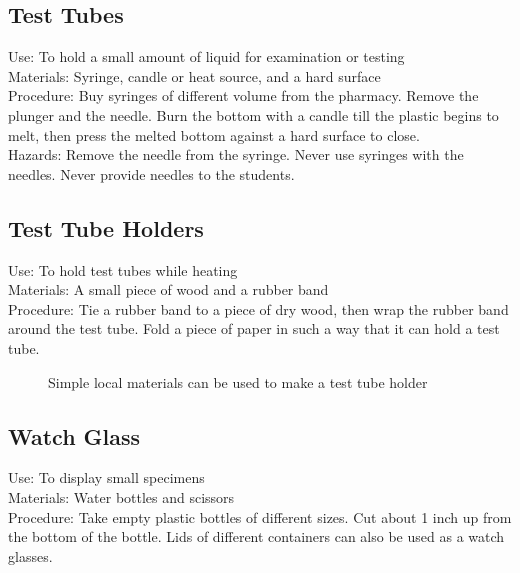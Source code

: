 \subsection*{Test Tubes}


Use: To hold a small amount of liquid for examination or testing\\
Materials: Syringe, candle or heat source, and a hard surface\\
Procedure: Buy syringes of different volume from the pharmacy. Remove the plunger and the needle. Burn the bottom with a candle till the plastic begins to melt, then press the melted bottom against a hard surface to close.\\
Hazards: Remove the needle from the syringe. Never use syringes with the needles. Never provide needles to the students.\\


\subsection*{Test Tube Holders}


Use: To hold test tubes while heating\\
Materials: A small piece of wood and a rubber band\\
Procedure: Tie a rubber band to a piece of dry wood, then wrap the rubber band around the test tube. Fold a piece of paper in such a way that it can hold a test tube.\\

\begin{figure}[H]
\begin{center}
\def\svgwidth{4cm}

\caption{Simple local materials can be used to make a test tube holder}
\label{fig:tube-holder}
\end{center}
\end{figure}


\subsection*{Watch Glass}


Use: To display small specimens\\
Materials: Water bottles and scissors\\
Procedure: Take empty plastic bottles of different sizes. Cut about 1 inch up from the bottom of the bottle. Lids of different containers can also be used as a watch glasses.\\


